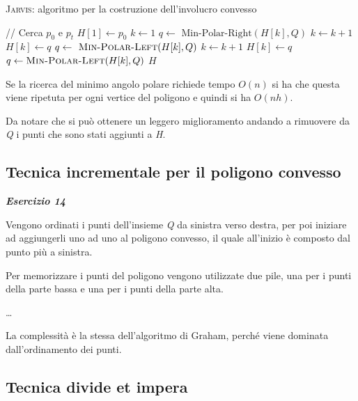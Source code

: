 \begin{breakablealgorithm}
	\caption{\textsc{Jarvis}: algoritmo per la costruzione dell'involucro convesso}
	\begin{algorithmic}[1]
			    \State // Cerca $p_0$ e $p_t$
			    \State $H[1] \gets p_0$ 
			    \State $k \gets 1$
			        \State $q \gets \text{ Min-Polar-Right}(H[k],Q)$ 
			        \State $k \gets k +1$
			        \State $H[k] \gets q$
			    \EndWhile
			    \State $q \gets \textsc{ Min-Polar-Left}(H[k],Q)$
			        \State $k \gets k+1$
			        \State $H[k] \gets q$
			        \State $q \gets \textsc{Min-Polar-Left}(H[k],Q)$
			    \EndWhile
			    \State \Return $H$
			\EndFunction
	\end{algorithmic}
\end{breakablealgorithm}

Se la ricerca del minimo angolo polare richiede tempo $O(n)$ si ha che questa viene ripetuta per ogni vertice del poligono e quindi si ha $O(nh)$.

Da notare che si può ottenere un leggero miglioramento andando a rimuovere da \emph{Q} i punti che sono stati aggiunti a \emph{H}.

\subsection{Tecnica incrementale per il poligono convesso}\label{tecnica-incrementale-per-il-poligono-convesso-es-14}

\textbf{\textit{Esercizio 14}} 

Vengono ordinati i punti dell'insieme \emph{Q} da sinistra verso destra, per poi iniziare ad aggiungerli uno ad uno al poligono convesso, il quale all'inizio è composto dal punto più a sinistra.

Per memorizzare i punti del poligono vengono utilizzate due pile, una per i punti della parte bassa e una per i punti della parte alta.

\ldots{}

La complessità è la stessa dell'algoritmo di Graham, perché viene dominata dall'ordinamento dei punti.

\subsection{Tecnica divide et impera}\label{tecnica-divide-et-impera-es-15}


